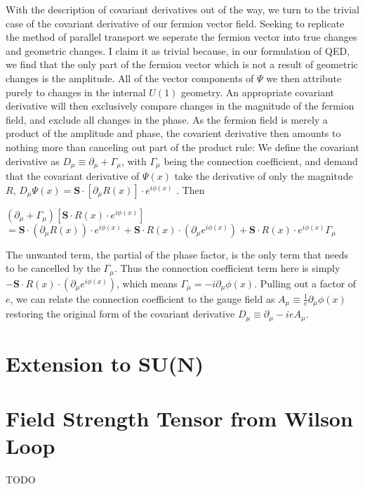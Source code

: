 \documentclass{article}
\begin{document}
        With the description of covariant derivatives out of the way, we turn to the trivial case of the covariant derivative of our fermion vector field. Seeking to replicate the method of parallel transport we seperate the fermion vector into true changes and geometric changes. I claim it as trivial because, in our formulation of QED, we find that the only part of the fermion vector which is not a result of geometric changes is the amplitude. All of the vector components of $\Psi$ we then attribute purely to changes in the internal $U(1)$ geometry. An appropriate covariant derivative will then exclusively compare changes in the magnitude of the fermion field, and exclude all changes in the phase. As the fermion field is merely a product of the amplitude and phase, the covarient derivative then amounts to nothing more than canceling out part of the product rule:
        We define the covariant derivative as $ D_\mu \equiv \partial_\mu + \Gamma_\mu $, with $\Gamma_\mu$ being the connection coefficient,
        and demand that the covariant derivative of $ \Psi(x) $ take the derivative of only the magnitude $R$,
        $D_\mu \Psi(x) = \mathbf{S} \cdot [\partial_\mu R(x) ] \cdot e^{i\phi(x)} $ . Then
        
        $ (\partial_\mu + \Gamma_\mu) [  \mathbf{S} \cdot R(x) \cdot e^{i\phi(x)} ] $ 
        $ = \mathbf{S} \cdot (\partial_\mu R(x) ) \cdot e^{i\phi(x)} +
           \mathbf{S} \cdot  R(x)  \cdot (\partial_\mu e^{i\phi(x)}) +
           \mathbf{S} \cdot  R(x)  \cdot e^{i\phi(x)} \Gamma_\mu $

        The unwanted term, the partial of the phase factor, is the only term that needs to be cancelled by the $\Gamma_\mu$. Thus the connection coefficient term here is simply $ - \mathbf{S} \cdot  R(x)  \cdot (\partial_\mu e^{i\phi(x)})  $, which means 
        $\Gamma_\mu = - i \partial_\mu \phi(x) $. Pulling out a factor of $e$, we can relate the connection coefficient to the gauge field
        as $A_\mu \equiv \frac{1}{e} \partial_\mu \phi(x)$ restoring the original form of the covariant derivative
        $ D_\mu \equiv \partial_\mu - i e A_\mu $.


\section{Extension to SU(N)}
        

\section{Field Strength Tensor from Wilson Loop}
        TODO
\end{document}
